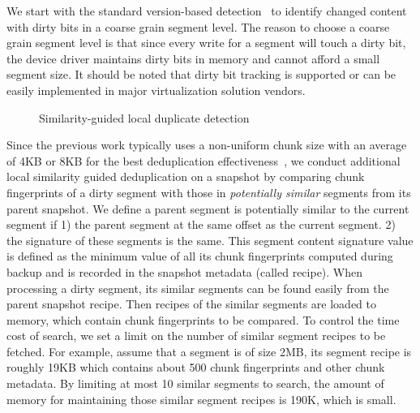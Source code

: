 \begin{itemize}

We start with the standard version-based detection~\cite{Clements2009,Vrable2009}
to identify changed content with dirty bits in a coarse grain segment level.
The reason to choose a coarse grain segment level is that 
since every write for a segment will touch a dirty bit, the device driver maintains dirty bits in 
memory and cannot afford a small segment size.
It should be noted that dirty bit tracking is supported or can be easily implemented in 
major virtualization solution vendors. 

\begin{figure}[htbp]
  \centering
  \caption{Similarity-guided local duplicate detection}
  \label{fig:local_dedup}
\end{figure}

Since the previous work typically uses a non-uniform chunk size 
with an average of 4KB or 8KB for the best deduplication 
effectiveness~\cite{Guo2011,extreme_binning09,bottleneck08,Dong2011},
we conduct additional local similarity guided deduplication on a snapshot by comparing
chunk fingerprints of a dirty segment 
with those in  {\em potentially similar} segments from its parent snapshot. 
We define a parent  segment is  potentially similar to the current segment if 1) the parent segment
at the same offset as the current segment.
2) the signature of these segments is the same.
This segment content signature value is defined as the minimum value of all its chunk fingerprints 
computed during backup and is recorded in the snapshot metadata (called recipe). 
When processing a dirty segment,
its  similar segments can be found easily from the
parent snapshot recipe.  Then recipes of the similar segments are loaded to memory,
which contain chunk fingerprints to be compared.
To control the time cost of search, we set a limit on the number of  similar segment recipes to be fetched. 
For example, assume that  a segment is of size  2MB, 
its segment recipe is roughly 19KB which contains about 500 chunk fingerprints and other chunk metadata.
By limiting at most 10 similar segments to search, the amount of memory for maintaining those 
similar segment recipes is 190K, which is small.


\end{itemize}
